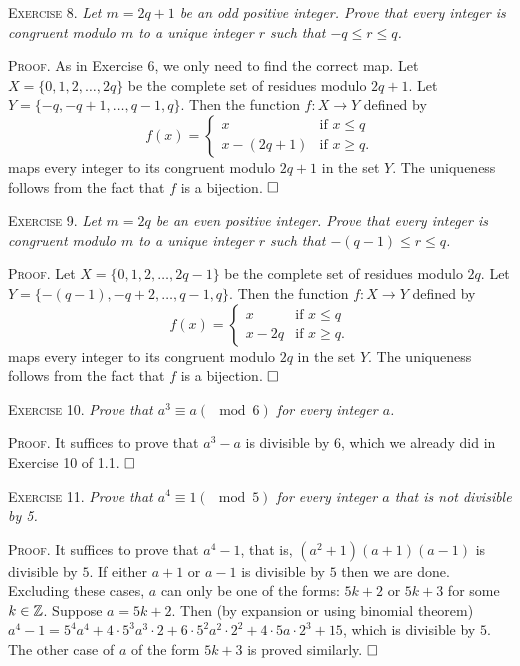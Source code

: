 \documentclass[11pt, leqno]{article}
\newcommand{\done}{\ensuremath{\hfill\square}}
\begin{document}
\textsc{Exercise 8}. \emph{Let $m = 2q + 1$ be an odd positive integer. Prove that every integer is congruent modulo $m$ to a unique integer $r$ such that $-q \leq r \leq q$.}

\textsc{Proof}. As in Exercise 6, we only need to find the correct map. Let $X=\{0,1,2,\ldots, 2q\}$ be the complete set of residues modulo $2q+1$. Let $Y = \{-q,-q+1,\ldots,q-1,q\}$. Then the function $f:X\to Y$ defined by 
\begin{displaymath}
f(x) =
\begin{cases}
  x & \text{if } x\leq q \\
  x-(2q+1) & \text{if } x\geq q.
\end{cases}
\end{displaymath}
maps every integer to its congruent modulo $2q+1$ in the set $Y$. The uniqueness follows from the fact that $f$ is a bijection. \done

\textsc{Exercise 9}. \emph{Let $m=2q$ be an even positive integer. Prove that every integer is congruent modulo $m$ to a unique integer $r$ such that $-(q-1) \leq r \leq q$.}

\textsc{Proof}. Let $X=\{0,1,2,\ldots,2q-1\}$ be the complete set of residues modulo $2q$. Let $Y=\{-(q-1),-q+2,\ldots,q-1,q\}$. Then the function $f:X\to Y$ defined by 
\begin{displaymath}
f(x) =
\begin{cases}
  x & \text{if } x \leq q \\
  x-2q & \text{if } x\geq q.
\end{cases}
\end{displaymath}
maps every integer to its congruent modulo $2q$ in the set $Y$. The uniqueness follows from the fact that $f$ is a bijection. \done

\textsc{Exercise 10}. \emph{Prove that $a^3 \equiv a (\mod 6)$ for every integer $a$.}

\textsc{Proof}. It suffices to prove that $a^3-a$ is divisible by $6$, which we already did in Exercise 10 of 1.1. \done

\textsc{Exercise 11}. \emph{Prove that $a^4\equiv 1 (\mod 5)$ for every integer $a$ that is not divisible by 5.}

\textsc{Proof}. It suffices to prove that $a^4-1$, that is, $(a^2+1)(a+1)(a-1)$ is divisible by $5$. If either $a+1$ or $a-1$ is divisible by $5$ then we are done. Excluding these cases, $a$ can only be one of the forms: $5k+2$ or $5k+3$ for some $k\in\mathbb{Z}$. Suppose $a=5k+2$. Then (by expansion or using binomial theorem) $a^4-1 = 5^4a^4 + 4\cdot 5^3a^3 \cdot 2 + 6\cdot 5^2a^2\cdot 2^2 + 4\cdot 5a\cdot 2^3 + 15$, which is divisible by $5$. The other case of $a$ of the form $5k+3$ is proved similarly. \done
\end{document}
